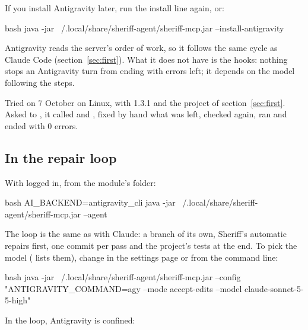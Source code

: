 \documentclass[11pt,a4paper]{article}
\begin{document}
If you install Antigravity later, run the install line again, or:

\begin{command}[basicstyle=\ttfamily\footnotesize]{bash}
java -jar ~/.local/share/sheriff-agent/sheriff-mcp.jar --install-antigravity
\end{command}

Antigravity reads the server's order of work, so it follows the same cycle as
Claude Code (section~\ref{sec:first}). What it does not have is the hooks: nothing stops an Antigravity turn from
ending with errors left; it depends on the model following the steps.

\begin{note}
Tried on 7 October on Linux, with  1.3.1 and the 
project of section~\ref{sec:first}. Asked to , it called  and , fixed
by hand what was left, checked again, ran  and ended with 0
errors.
\end{note}

\subsection{In the repair loop}

With  logged in, from the module's folder:

\begin{command}[basicstyle=\ttfamily\footnotesize]{bash}
AI_BACKEND=antigravity_cli java -jar ~/.local/share/sheriff-agent/sheriff-mcp.jar --agent
\end{command}

The loop is the same as with Claude: a branch of its own, Sheriff's automatic
repairs first, one commit per pass and the project's tests at the end.
To pick the model ( lists them), change
 in the settings page or from the command line:

\begin{command}{bash}
java -jar ~/.local/share/sheriff-agent/sheriff-mcp.jar --config "ANTIGRAVITY_COMMAND=agy --mode accept-edits --model claude-sonnet-5-5-high"
\end{command}

In the loop, Antigravity is confined:
\end{document}
